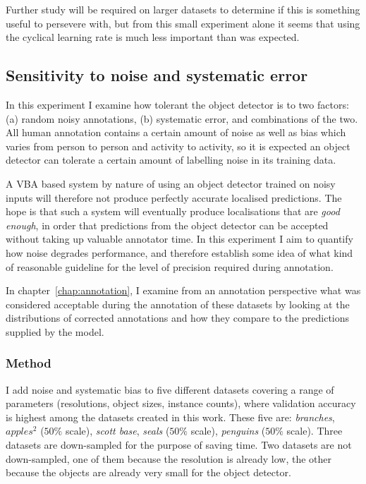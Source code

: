 Further study will be required on larger datasets to determine if this is something useful to persevere with, but from this small experiment alone it seems that using the cyclical learning rate is much less important than was expected.


\subsection{Sensitivity to noise and systematic error}
\label{sec:noise_sensitivity}

In this experiment I examine how tolerant the object detector is to two factors: (a) random noisy annotations, (b) systematic error, and combinations of the two. All human annotation contains a certain amount of noise as well as bias which varies from person to person and activity to activity, so it is expected an object detector can tolerate a certain amount of labelling noise in its training data. 

A \gls{VBA} based system by nature of using an object detector trained on noisy inputs will therefore not produce perfectly accurate localised predictions. The hope is that such a system will eventually produce localisations that are \emph{good enough}, in order that predictions from the object detector can be accepted without taking up valuable annotator time. In this experiment I aim to quantify how noise degrades performance, and therefore establish some idea of what kind of reasonable guideline for the level of precision required during annotation.

In chapter~\ref{chap:annotation}, I examine from an annotation perspective what was considered acceptable during the annotation of these datasets by looking at the distributions of corrected annotations and how they compare to the predictions supplied by the model. 

\subsubsection{Method}

I add noise and systematic bias to five different datasets covering a range of parameters (resolutions, object sizes, instance counts), where validation accuracy is highest among the datasets created in this work. These five are: \emph{branches}, $apples^2$ ($50\%$ scale), \emph{scott base}, \emph{seals} ($50\%$ scale), \emph{penguins} ($50\%$ scale). Three datasets are down-sampled for the purpose of saving time. Two datasets are not down-sampled, one of them because the resolution is already low, the other because the objects are already very small for the object detector.

